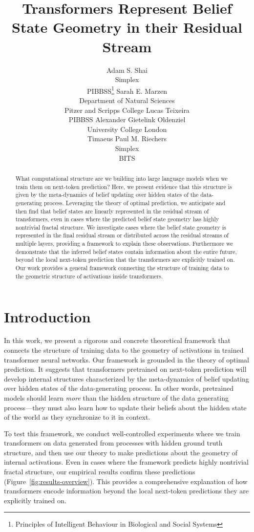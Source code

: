 \documentclass{article}
\title{Transformers Represent Belief State Geometry in their Residual Stream}
\author{Adam S. Shai\\
Simplex\\
PIBBSS\thanks{Principles of Intelligent Behaviour in Biological and Social Systems}
\And
Sarah E. Marzen\\
Department of Natural Sciences\\
Pitzer and Scripps College
\And
Lucas Teixeira\\
PIBBSS
\And
Alexander Gietelink Oldenziel\\
University College London\\
Timaeus
\And
Paul M. Riechers\\
Simplex\\
BITS
}
\begin{document}
\maketitle

\begin{abstract}
What computational structure are we building into large language models when we train them on next-token prediction? Here, we present evidence that this structure is given by the meta-dynamics of belief updating over hidden states of the data-generating process. Leveraging the theory of optimal prediction, we anticipate and then find that belief states are linearly represented in the residual stream of transformers, even in cases where the predicted belief state geometry has highly nontrivial fractal structure. We investigate cases where the belief state geometry is represented in the final residual stream or distributed across the residual streams of multiple layers, providing a framework to explain these observations. Furthermore we demonstrate that the inferred belief states contain information about the entire future, beyond the local next-token prediction that the transformers are explicitly trained on. Our work provides a general framework connecting the structure of training data to the geometric structure of activations inside transformers.
\end{abstract}

\section{Introduction}

In this work, we present a rigorous and concrete theoretical framework that connects the structure of training data to the geometry of activations in trained transformer neural networks. Our framework is grounded in the theory of optimal prediction. It suggests that transformers pretrained on next-token prediction will develop internal structures characterized by the meta-dynamics of belief updating over hidden states of the data-generating process. In other words, pretrained models should learn \emph{more} than
the hidden structure of the data generating process---they must also learn how to update their beliefs about the hidden state of the world as they synchronize to it in context.

To test this framework, we conduct well-controlled experiments where we train transformers on data generated from processes with hidden ground truth structure, and then use our theory to make predictions about the geometry of internal activations. Even in cases where the framework predicts highly nontrivial fractal structure, our empirical results confirm these predictions (Figure~\ref{fig:results-overview}). This provides a comprehensive explanation of how transformers encode information beyond the local next-token predictions they are explicitly trained on.
\end{document}
